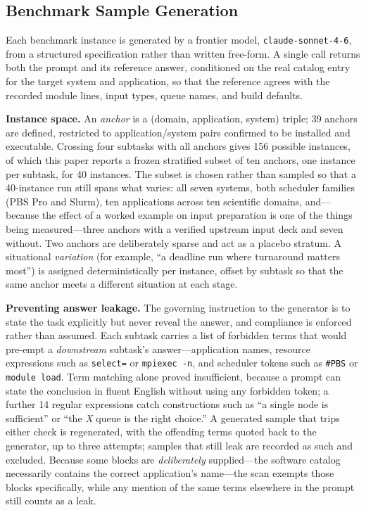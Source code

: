 \documentclass[conference]{IEEEtran}
\begin{document}
\subsection{Benchmark Sample Generation}\label{sec:generation}
Each benchmark instance is generated by a frontier model, \texttt{claude-sonnet-4-6}, from a structured specification rather than written free-form. A single call returns both the prompt and its reference answer, conditioned on the real catalog entry for the target system and application, so that the reference agrees with the recorded module lines, input types, queue names, and build defaults.

\textbf{Instance space.} An \emph{anchor} is a (domain, application, system) triple; 39 anchors are defined, restricted to application/system pairs confirmed to be installed and executable. Crossing four subtasks with all anchors gives 156 possible instances, of which this paper reports a frozen stratified subset of ten anchors, one instance per subtask, for 40 instances. The subset is chosen rather than sampled so that a 40-instance run still spans what varies: all seven systems, both scheduler families (PBS Pro and Slurm), ten applications across ten scientific domains, and---because the effect of a worked example on input preparation is one of the things being measured---three anchors with a verified upstream input deck and seven without. Two anchors are deliberately sparse and act as a placebo stratum. A situational \emph{variation} (for example, ``a deadline run where turnaround matters most'') is assigned deterministically per instance, offset by subtask so that the same anchor meets a different situation at each stage.

\textbf{Preventing answer leakage.} The governing instruction to the generator is to state the task explicitly but never reveal the answer, and compliance is enforced rather than assumed. Each subtask carries a list of forbidden terms that would pre-empt a \emph{downstream} subtask's answer---application names, resource expressions such as \texttt{select=} or \texttt{mpiexec -n}, and scheduler tokens such as \texttt{\#PBS} or \texttt{module load}. Term matching alone proved insufficient, because a prompt can state the conclusion in fluent English without using any forbidden token; a further 14 regular expressions catch constructions such as ``a single node is sufficient'' or ``the \emph{X} queue is the right choice.'' A generated sample that trips either check is regenerated, with the offending terms quoted back to the generator, up to three attempts; samples that still leak are recorded as such and excluded. Because some blocks are \emph{deliberately} supplied---the software catalog necessarily contains the correct application's name---the scan exempts those blocks specifically, while any mention of the same terms elsewhere in the prompt still counts as a leak.
\end{document}
